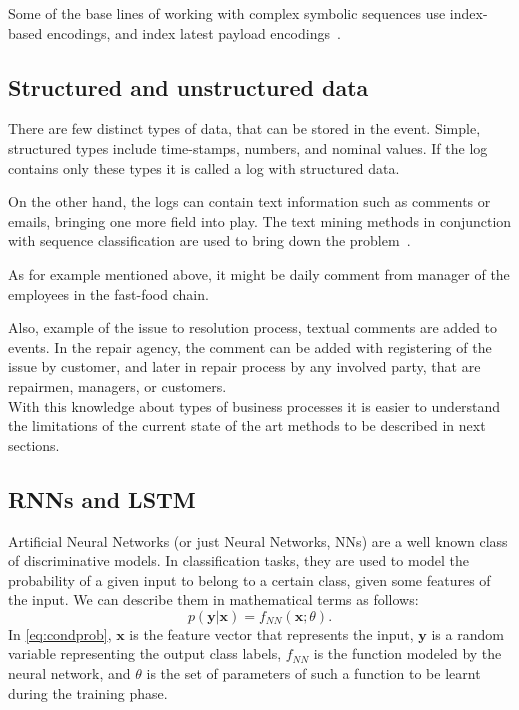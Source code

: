 Some of the base lines of working with complex symbolic sequences use index-based encodings, and index latest payload encodings~\cite{Leontjeva2015}.   

\subsection{Structured and unstructured data}

There are few distinct types of data, that can be stored in the event. Simple, structured types include time-stamps, numbers, and nominal values. If the log contains only these types it is called a log with structured data. 

On the other hand, the logs can contain text information such as comments or emails, bringing one more field into play. The text mining methods in conjunction with sequence classification are used to bring down the problem~\cite{Teinemaa2016}.

As for example mentioned above, it might be daily comment from manager of the employees in the fast-food chain. 

Also, example of the issue to resolution process, textual comments are added to events. In the repair agency, the comment can be added with registering of the issue by customer, and later in repair process by any involved party, that are repairmen, managers, or customers.
\\

With this knowledge about types of business processes it is easier to understand the limitations of the current state of the art methods to be described in next sections. 




\subsection{RNNs and LSTM}
Artificial Neural Networks (or just Neural Networks, NNs) are a well
known class of discriminative models. In classification tasks, they are
used to model the probability of a given input to belong to a certain
class, given some features of the input. We can describe them in
mathematical terms as follows:
%
\begin{equation}
  \label{eq:condprob}
  p(\mathbf{y}|\mathbf{x}) = f_{\mathit{NN}}(\mathbf{x}; \theta).
\end{equation}
%
In \eqref{eq:condprob}, $\mathbf{x}$ is the feature vector that represents the input,
$\mathbf{y}$ is a random variable representing the output class
labels, $f_{\mathit{NN}}$ is the function modeled by the neural network, and
$\theta$ is the set of parameters of such a function to be learnt during
the training phase.


